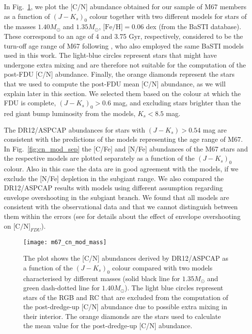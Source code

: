 \documentclass[a4paper,fleqn,usenatbib]{mnras}
\begin{document}
In Fig.~\ref{fig:cn_mod}, we plot the [C/N] abundance obtained for our sample of M67 members as a function of  $(J-K_s)_0$ colour together with two different models for stars of the masses $1.40 M_{\odot}$  and $1.35 M_{\odot}$, $\text{[Fe/H]}=0.06$ dex (from the BaSTI database). These correspond to an age of 4 and 3.75 Gyr, respectively, considered to be the turn-off age range of M67 following \citet{bellini2010}, who also employed the same BaSTI models used in this work.
The light-blue circles represent stars that might have undergone extra mixing and are therefore not suitable for the computation of the post-FDU [C/N] abundance. Finally, the orange diamonds represent the stars that we used to compute the post-FDU mean [C/N] abundance, as we will explain later in this section. We selected them based on the colour at which the FDU is complete, $(J-K_s)_0>0.6$ mag, and excluding stars brighter than the red giant bump luminosity from the models, $K_s<8.5$ mag.

The DR12/ASPCAP abundances for stars with $(J-K_s)>0.54$ mag are consistent with the predictions of the models representing the age range of M67. In Fig.~\ref{fig:cn_mod_sep} the [C/Fe] and [N/Fe] abundances of the M67 stars and the respective models are plotted separately as a function of the $(J-K_s)_0$ colour. Also in this case the data are in good agreement with the models, if we exclude the [N/Fe] depletion in the subgiant range. We also compared the DR12/ASPCAP results with models using different assumption regarding envelope overshooting in the subgiant branch. We found that all models are consistent with the observational data and that we cannot distinguish between them within the errors (see \citealt{salaris2015} for details about the effect of envelope overshooting on $\text{[C/N]}_{FDU}$).

\begin{figure}
	\texttt{[image: m67\_cn\_mod\_mass]}
	\caption{The plot shows the [C/N] abundances derived by DR12/ASPCAP as a function of the $(J-K_s)_0$ colour compared with two models  characterised by different masses (solid black line for $1.35 M_{\odot}$ and green dash-dotted line for $1.40 M_{\odot}$). The light blue circles represent stars of the RGB and RC that are excluded from the computation of the post-dredge-up [C/N] abundance due to possible extra mixing in their interior. The orange diamonds are the stars used to calculate the mean value for the post-dredge-up [C/N] abundance.}
	\label{fig:cn_mod}
\end{figure}
\end{document}
